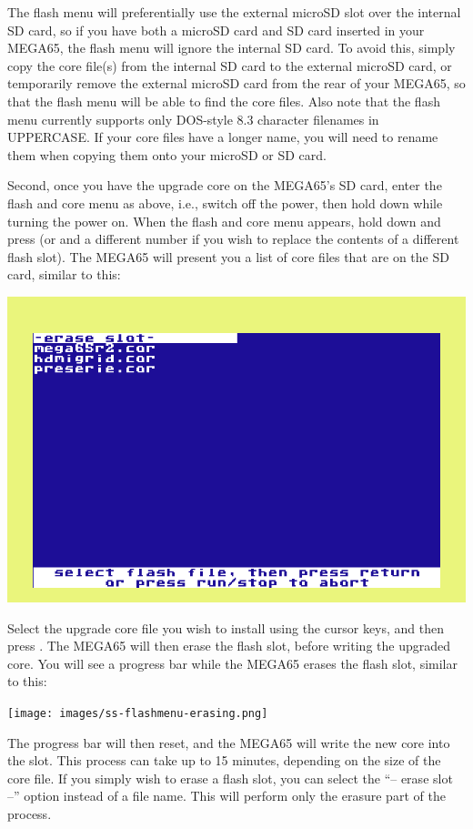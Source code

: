 The flash menu will preferentially use the external microSD slot over
the internal SD card, so if you have both a microSD card and SD card
inserted in your MEGA65, the flash menu will ignore the
internal SD card. To avoid this, simply copy the core file(s) from the internal SD
card to the external microSD card, or temporarily remove the external
microSD card from the rear of your MEGA65, so that the flash menu will
be able to find the core files.  Also note that the flash menu
currently supports only DOS-style 8.3 character filenames in UPPERCASE. If your
core files have a longer name, you will need to rename them when
copying them onto your microSD or SD card.

Second, once you have the upgrade core on the MEGA65's SD card, enter the flash and core menu as above,
i.e., switch off the power, then hold  down while turning the power on.  When the flash
and core menu appears, hold  down and press
 (or  and a different number if you wish to replace the
contents of a different flash slot).  The MEGA65
will present you a list of core files that are on the SD card, similar
to this:

\includegraphics[width=\linewidth]{images/ss-flashmenu-selectcore.png}

Select the upgrade core file you wish to
install using the cursor keys, and then press .  The MEGA65 will then erase
the flash slot, before writing the upgraded core.  You will see a progress bar while the MEGA65 erases
the flash slot, similar to this:

\texttt{[image: images/ss-flashmenu-erasing.png]}

The progress bar will then reset, and the MEGA65 will
write the new core into the slot. This process can take up to 15
minutes, depending on the size of the core file.  If you simply wish
to erase a flash slot, you can select the
``-- erase slot --'' option instead of a file name. This will perform
only the erasure part of the process.

